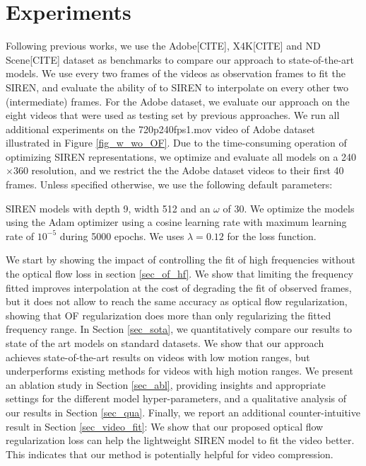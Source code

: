 \documentclass{article}
\begin{document}
\section{Experiments}

Following previous works, we use the Adobe[CITE], X4K[CITE] and ND Scene[CITE] dataset as benchmarks to compare our approach to state-of-the-art models.
We use every two frames of the videos as observation frames to fit the SIREN,
and evaluate the ability of to SIREN to interpolate on every other two (intermediate) frames.
For the Adobe dataset, we evaluate our approach on the eight videos that were used as testing set by previous approaches.
We run all additional experiments on the 720p240fps1.mov video of Adobe dataset illustrated in Figure \ref{fig_w_wo_OF}.
Due to the time-consuming operation of optimizing SIREN representations,
we optimize and evaluate all models on a 240$\times$360 resolution,
and we restrict the the Adobe dataset videos to their first 40 frames.
Unless specified otherwise, we use the following default parameters:

SIREN models with depth 9, width 512 and an $\omega$ of 30.
We optimize the models using the Adam optimizer using a cosine learning rate with maximum learning rate of $10^{-5}$ during 5000 epochs.
We uses $\lambda = 0.12$ for the loss function.

We start by showing the impact of controlling the fit of high frequencies without the optical flow loss in section \ref{sec_of_hf}.
We show that limiting the frequency fitted improves interpolation at the cost of degrading the fit of observed frames,
but it does not allow to reach the same accuracy as optical flow regularization,
showing that OF regularization does more than only regularizing the fitted frequency range.
In Section \ref{sec_sota}, we quantitatively compare our results to state of the art models on standard datasets.
We show that our approach achieves state-of-the-art results on videos with low motion ranges,
but underperforms existing methods for videos with high motion ranges.
We present an ablation study in Section \ref{sec_abl},
providing insights and appropriate settings for the different model hyper-parameters,
and a qualitative analysis of our results in Section \ref{sec_qua}.
Finally, we report an additional counter-intuitive result in Section \ref{sec_video_fit}:
We show that our proposed optical flow regularization loss can help the lightweight SIREN model to fit the video better.
This indicates that our method is potentially helpful for video compression.
\end{document}
